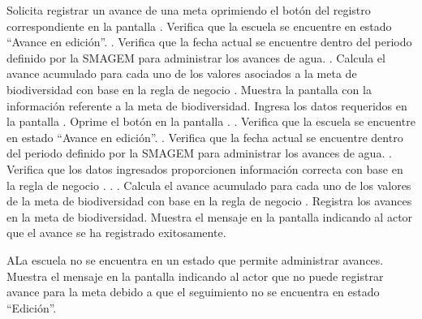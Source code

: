  \begin{UCtrayectoria}
    \UCpaso[\UCactor] Solicita registrar un avance de una meta oprimiendo el botón \botMetas del registro correspondiente en la pantalla .
    \UCpaso[\UCsist] Verifica que la escuela se encuentre en estado ``Avance en edición''. .
    \UCpaso[\UCsist] Verifica que la fecha actual se encuentre dentro del periodo definido por la SMAGEM para administrar los avances de agua. .
    \UCpaso[\UCsist] Calcula el avance acumulado para cada uno de los valores asociados a la meta de biodiversidad con base en la regla de negocio .
    \UCpaso[\UCsist] Muestra la pantalla  con la información referente a la meta de biodiversidad. 
    \UCpaso[\UCactor] Ingresa los datos requeridos en la pantalla . \label{cus10:RegAvance}
    \UCpaso[\UCactor] Oprime el botón  en la pantalla . .
    Verifica que la escuela se encuentre en estado ``Avance en edición''. .
    \UCpaso[\UCsist] Verifica que la fecha actual se encuentre dentro del periodo definido por la SMAGEM para administrar los avances de agua. .
    \UCpaso[\UCsist] Verifica que los datos ingresados proporcionen información correcta con base en la regla de negocio . . .          
    \UCpaso[\UCsist] Calcula el avance acumulado para cada uno de los valores de la meta de biodiversidad con base en la regla de negocio .
    \UCpaso[\UCsist] Registra los avances en la meta de biodiversidad.
    \UCpaso[\UCsist] Muestra el mensaje  en la pantalla  indicando al actor que el avance se ha registrado exitosamente.
 \end{UCtrayectoria}
 
    \begin{UCtrayectoriaA}{A}{La escuela no se encuentra en un estado que permite administrar avances.}
    \UCpaso[\UCsist] Muestra el mensaje  en la pantalla  indicando al actor que no puede registrar avance para la meta debido a que el seguimiento no se encuentra en estado ``Edición''. 
    \end{UCtrayectoriaA}
 
